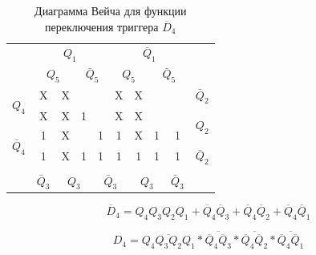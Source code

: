 \documentclass[a4paper,14pt]{article}
\begin{document}
\begin{table}[H]
	\begin{center}
		\caption{\label{tab:unD4_tab} Диаграмма Вейча для функции переключения триггера $\overline{D}_4$ }
		\begin{tabular}{cccccccccc}
			& \multicolumn{4}{c}{$Q_1$} & \multicolumn{4}{c}{$\bar{Q}_1$} &  \\
			& \multicolumn{2}{c}{$Q_5$} & \multicolumn{2}{c}{$\bar{Q}_5$} & \multicolumn{2}{c}{$Q_5$} & \multicolumn{2}{c}{$\bar{Q}_5$} &  \\ \cline{2-9}
			\multicolumn{1}{c|}{\multirow{2}{*}{$Q_4$}} & \multicolumn{1}{c|}{X} & \multicolumn{1}{c|}{X} & \multicolumn{1}{c|}{} & \multicolumn{1}{c|}{} & \multicolumn{1}{c|}{X} & \multicolumn{1}{c|}{X} & \multicolumn{1}{c|}{} & \multicolumn{1}{c|}{} & $\bar{Q}_2$ \\ \cline{2-9}
			\multicolumn{1}{c|}{} & \multicolumn{1}{c|}{X} & \multicolumn{1}{c|}{X} & \multicolumn{1}{c|}{1} & \multicolumn{1}{c|}{} & \multicolumn{1}{c|}{X} & \multicolumn{1}{c|}{X} & \multicolumn{1}{c|}{} & \multicolumn{1}{c|}{} & \multirow{2}{*}{$Q_2$} \\ \cline{2-9}
			\multicolumn{1}{c|}{\multirow{2}{*}{$\bar{Q}_4$}} & \multicolumn{1}{c|}{1} & \multicolumn{1}{c|}{X} & \multicolumn{1}{c|}{} & \multicolumn{1}{c|}{1} & \multicolumn{1}{c|}{1} & \multicolumn{1}{c|}{X} & \multicolumn{1}{c|}{1} & \multicolumn{1}{c|}{1} &  \\ \cline{2-9}
			\multicolumn{1}{c|}{} & \multicolumn{1}{c|}{1} & \multicolumn{1}{c|}{X} & \multicolumn{1}{c|}{1} & \multicolumn{1}{c|}{1} & \multicolumn{1}{c|}{1} & \multicolumn{1}{c|}{1} & \multicolumn{1}{c|}{1} & \multicolumn{1}{c|}{1} & $\bar{Q}_2$ \\ \cline{2-9}
			&  & \multicolumn{2}{c}{} & \multicolumn{2}{c}{} & \multicolumn{2}{c}{} &  &  \\
			& $\bar{Q}_3$ & \multicolumn{2}{c}{$Q_3$} & \multicolumn{2}{c}{$\bar{Q}_3$} & \multicolumn{2}{c}{$Q_3$} & $\bar{Q}_3$ & 
		\end{tabular}
	\end{center}
\end{table}

$$\overline{D}_4 = Q_4Q_3Q_2Q_1 + \overline{Q}_4\overline{Q}_3 + \overline{Q}_4\overline{Q}_2 + \overline{Q}_4\overline{Q}_1$$

$$D_4 = \overline{Q_4Q_3Q_2Q_1} * \overline{\overline{Q}_4\overline{Q}_3}* \overline{\overline{Q}_4\overline{Q}_2}* \overline{\overline{Q}_4\overline{Q}_1}$$
\end{document}
